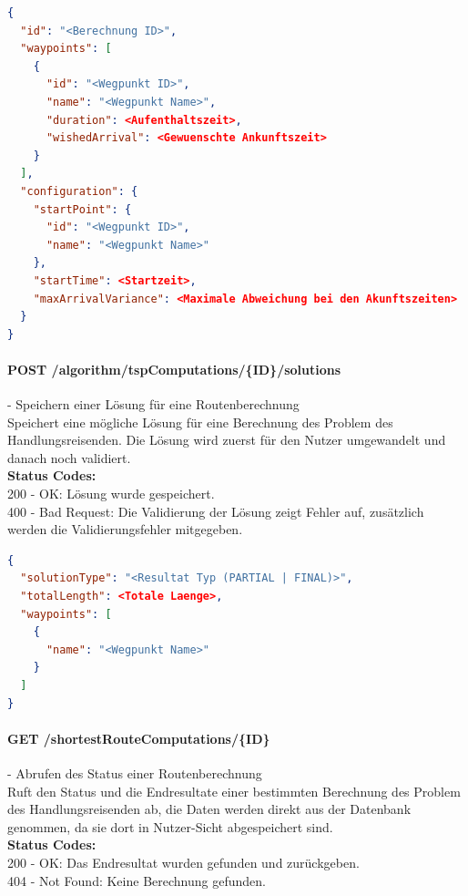\begin{lstlisting}[language=JSON, caption=Beispiel für Eingabedaten des Problem des Handlungsreisenden für den Algorithmus, label=lst:input_tsp_algo]  
{
  "id": "<Berechnung ID>",
  "waypoints": [
    {
      "id": "<Wegpunkt ID>",
      "name": "<Wegpunkt Name>",
      "duration": <Aufenthaltszeit>,
      "wishedArrival": <Gewuenschte Ankunftszeit>
    }
  ],
  "configuration": {
    "startPoint": {
      "id": "<Wegpunkt ID>",
      "name": "<Wegpunkt Name>"
    },
    "startTime": <Startzeit>,
    "maxArrivalVariance": <Maximale Abweichung bei den Akunftszeiten>
  }
}
\end{lstlisting}

\paragraph{POST /algorithm/tspComputations/\{ID\}/solutions} - Speichern einer Lösung für eine Routenberechnung\mbox{}\\
Speichert eine mögliche Lösung für eine Berechnung des Problem des Handlungsreisenden. Die Lösung wird zuerst für den Nutzer umgewandelt und danach noch validiert.\\
\textbf{Status Codes:}\\
200 - OK: Lösung wurde gespeichert.\\
400 - Bad Request: Die Validierung der Lösung zeigt Fehler auf, zusätzlich werden die Validierungsfehler mitgegeben.\\

\begin{lstlisting}[language=JSON, caption=Beispiel eines Resultates für das Problem des Handlungsreisenden aus Algorithmus-Sicht, label=lst:solution_tsp_algo]  
{
  "solutionType": "<Resultat Typ (PARTIAL | FINAL)>",
  "totalLength": <Totale Laenge>,
  "waypoints": [
    {
      "name": "<Wegpunkt Name>"
    }
  ]
}
\end{lstlisting}

\paragraph{GET /shortestRouteComputations/\{ID\}} - Abrufen des Status einer Routenberechnung\mbox{}\\
Ruft den Status und die Endresultate einer bestimmten Berechnung des Problem des Handlungsreisenden ab, die Daten werden direkt aus der Datenbank genommen, da sie dort in Nutzer-Sicht abgespeichert sind.\\
\textbf{Status Codes:}\\
200 - OK: Das Endresultat wurden gefunden und zurückgeben.\\
404 - Not Found: Keine Berechnung gefunden.\\

